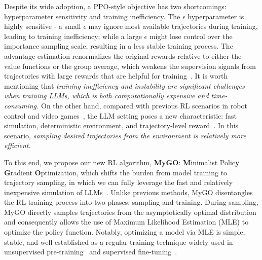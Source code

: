 Despite its wide adoption, a PPO-style objective has two shortcomings: hyperparameter sensitivity and training inefficiency.
The $\epsilon$ hyperparameter is highly sensitive - a small $\epsilon$ may ignore most available trajectories during training, leading to training inefficiency; while a large $\epsilon$ might lose control over the importance sampling scale, resulting in a less stable training process.
The advantage estimation renormalizes the original rewards relative to either the value functions or the group average, 
which weakens the supervision signals from trajectories with large rewards that are helpful for training~\cite{liu2024decade}.
It is worth mentioning that \emph{training inefficiency and instability are significant challenges when training LLMs, which is both computationally expensive and time-consuming.}
On the other hand, compared with previous RL scenarios in robot control and video games~\cite{openai2016gym}, the LLM setting poses a new characteristic: fast simulation, deterministic environment, and trajectory-level reward~\cite{li2024remax}.
In this scenario, \emph{sampling desired trajectories from the environment is relatively more efficient.} 


To this end, we propose our new RL algorithm, \textbf{MyGO}: \textbf{M}inimalist Polic\textbf{y} \textbf{G}radient \textbf{O}ptimization, which shifts the burden from model training to trajectory sampling,
in which we can fully leverage the fast and relatively inexpensive simulation of LLMs~\cite{kwon2023efficient, zheng2024sglang}. 
Unlike previous methods, MyGO disentangles the RL training process into two phases: sampling and training.
During sampling, MyGO directly samples trajectories from the asymptotically optimal distribution and consequently allows the use of Maximum Likelihood Estimation (MLE) to optimize the policy function.
Notably, optimizing a model via MLE is simple, stable, and well established as a regular training technique widely used in unsupervised pre-training~\cite{radford2018improving} and supervised fine-tuning~\cite{ouyang2022training}.


